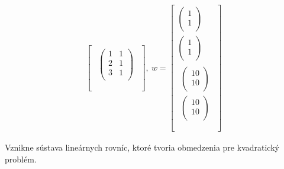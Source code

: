 \begin{equation}
\begin{split}
\begin{bmatrix}
\begin{matrix}
\begin{pmatrix}
1 & 1 \\
2 & 1 \\
3 & 1 \\
\end{pmatrix} \\
\end{matrix} \\
\end{bmatrix},\ w = \begin{bmatrix}
\begin{pmatrix}
1 \\
1 \\
\end{pmatrix} \\
\begin{pmatrix}
1 \\
1 \\
\end{pmatrix} \\
\begin{matrix}
\begin{pmatrix}
10 \\
10 \\
\end{pmatrix} \\
\begin{pmatrix}
10 \\
10 \\
\end{pmatrix} \\
\end{matrix} \\
\end{bmatrix}
\end{split}
\end{equation}

Vznikne sústava lineárnych rovníc, ktoré tvoria obmedzenia pre
kvadratický problém.


